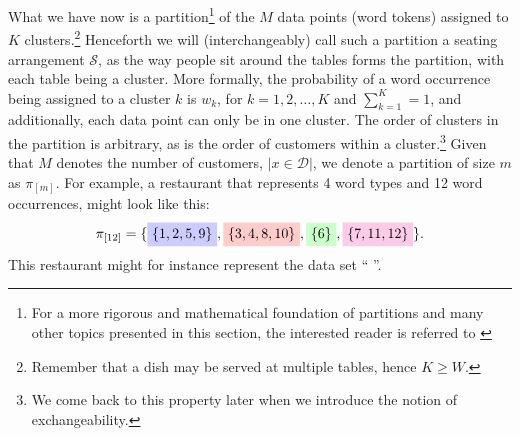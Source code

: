 What we have now is a partition\footnote{For a more rigorous and mathematical foundation of partitions and many other topics presented in this section, the interested reader is referred to \cite{Pitman2006Combinatorial}} of the $M$ data points (word tokens) assigned to $K$ clusters.\footnote{Remember that a dish may be served at multiple tables, hence $K\geq W$.} Henceforth we will (interchangeably) call such a partition a seating arrangement $\mathcal{S}$, as the way people sit around the tables forms the partition, with each table being a cluster. More formally, the probability of a word occurrence being assigned to a cluster $k$ is $w_k$, for $k = 1, 2, \ldots, K$ and $\sum_{k=1}^K = 1$, and additionally, each data point can only be in one cluster. The order of clusters in the partition is arbitrary, as is the order of customers within a cluster.\footnote{We come back to this property later when we introduce the notion of exchangeability.} Given that $M$ denotes the number of customers, $|x\in\mathcal{D}|$, we denote a partition of size $m$ as $\pi_{[m]}$. %
%
%
For example, a restaurant that represents 4 word types and 12 word occurrences, might look like this: 
\begin{equation}\label{eq:partitionexample}
    \pi_{[12]} = \{\tikz[baseline,remember picture]{\node[fill=blue!20,anchor=base] (t11) {$\{1,2,5,9\}$};},\tikz[baseline,remember picture]{\node[fill=red!20,anchor=base] (t12) {$\{3,4,8,10\}$};},\tikz[baseline,remember picture]{\node[fill=green!20,anchor=base] (t13) {$\{6\}$};},\tikz[baseline,remember picture]{\node[fill=magenta!20,anchor=base] (t14) {$\{7,11,12\}$};}\}.
\end{equation}
This restaurant might for instance represent the data set ``%
''. 


